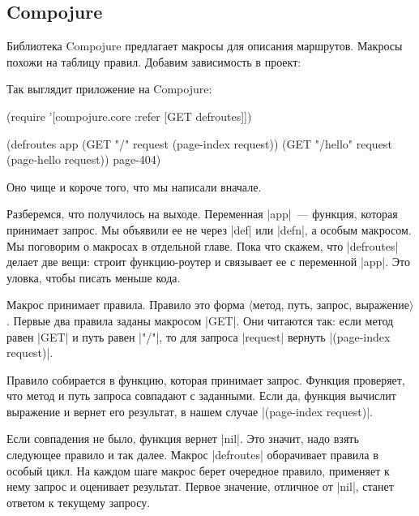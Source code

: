 \subsection{Compojure}

\label{compojure}

Библиотека Compojure
предлагает макросы для описания маршрутов. Макросы похожи на таблицу правил.
Добавим зависимость в проект:

\begin{english}
  \begin{clojure}
[compojure "1.6.1"]
  \end{clojure}
\end{english}

\noindent
Так выглядит приложение на Compojure:

\begin{english}
  \begin{clojure}
(require '[compojure.core :refer [GET defroutes]])

(defroutes app
  (GET "/"      request (page-index request))
  (GET "/hello" request (page-hello request))
  page-404)
  \end{clojure}
\end{english}

\noindent
Оно чище и короче того, что мы написали вначале.

Разберемся, что получилось на выходе. Переменная \spverb|app|~--- функция,
которая принимает запрос. Мы объявили ее не через \spverb|def| или
\spverb|defn|, а особым макросом. Мы поговорим о макросах в отдельной
главе. Пока что скажем, что \spverb|defroutes| делает две вещи: строит
функцию-роутер и связывает ее с переменной \spverb|app|. Это уловка, чтобы
писать меньше кода.

Макрос принимает правила. Правило это форма $\langle$метод, путь, запрос,
выражение$\rangle$. Первые два правила заданы макросом \spverb|GET|. Они
читаются так: если метод равен \spverb|GET| и путь равен \spverb|"/"|, то для
запроса \spverb|request| вернуть \spverb|(page-index request)|.

Правило собирается в функцию, которая принимает запрос. Функция проверяет, что
метод и путь запроса совпадают с заданными. Если да, функция вычислит выражение
и вернет его результат, в нашем случае \spverb|(page-index request)|.

Если совпадения не было, функция вернет \spverb|nil|. Это значит, надо взять
следующее правило и так далее. Макрос \spverb|defroutes| оборачивает правила в
особый цикл. На каждом шаге макрос берет очередное правило, применяет к нему
запрос и оценивает результат. Первое значение, отличное от \spverb|nil|, станет
ответом к текущему запросу.

